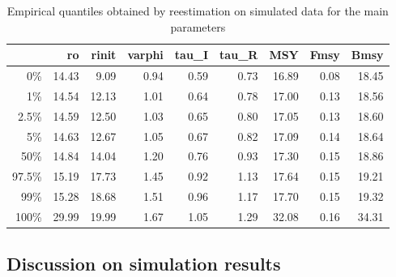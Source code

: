 \begin{table}[ht]
\begin{center}
\begin{tabular}{rrrrrrrrr}
  \hline
 & ro & rinit & varphi & tau\_I & tau\_R & MSY & Fmsy & Bmsy \\ 
  \hline
0\% & 14.43 & 9.09 & 0.94 & 0.59 & 0.73 & 16.89 & 0.08 & 18.45 \\ 
  1\% & 14.54 & 12.13 & 1.01 & 0.64 & 0.78 & 17.00 & 0.13 & 18.56 \\ 
  2.5\% & 14.59 & 12.50 & 1.03 & 0.65 & 0.80 & 17.05 & 0.13 & 18.60 \\ 
  5\% & 14.63 & 12.67 & 1.05 & 0.67 & 0.82 & 17.09 & 0.14 & 18.64 \\ 
  50\% & 14.84 & 14.04 & 1.20 & 0.76 & 0.93 & 17.30 & 0.15 & 18.86 \\ 
  97.5\% & 15.19 & 17.73 & 1.45 & 0.92 & 1.13 & 17.64 & 0.15 & 19.21 \\ 
  99\% & 15.28 & 18.68 & 1.51 & 0.96 & 1.17 & 17.70 & 0.15 & 19.32 \\ 
  100\% & 29.99 & 19.99 & 1.67 & 1.05 & 1.29 & 32.08 & 0.16 & 34.31 \\ 
   \hline
\end{tabular}
\end{center}
\caption{Empirical quantiles obtained by reestimation on simulated data for the main parameters}
\end{table}
















\subsection{Discussion on simulation results}
